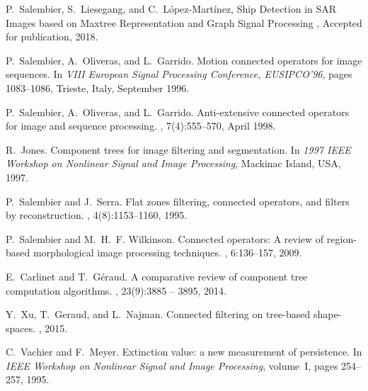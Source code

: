 \documentclass[DIV=calc, paper=a4, fontsize=11pt]{scrartcl}	 %
\begin{document}
\begin{thebibliography}{1}

P.~Salembier, S.~Liesegang, and C.~L\'opez-Mart\'inez,
\newblock Ship Detection in SAR Images based on Maxtree Representation and Graph Signal Processing
, Accepted for publication, 2018.
  
P.~Salembier, A.~Oliveras, and L.~Garrido.
\newblock Motion connected operators for image sequences.
\newblock In {\em VIII European Signal Processing Conference, EUSIPCO'96},
  pages 1083--1086, Trieste, Italy, September 1996.

P.~Salembier, A.~Oliveras, and L.~Garrido.
\newblock Anti-extensive connected operators for image and sequence processing.
, 7(4):555--570, April
  1998.

R.~Jones.
\newblock Component trees for image filtering and segmentation.
\newblock In {\em 1997 IEEE Workshop on Nonlinear Signal and Image Processing},
  Mackinac Island, USA, 1997.

P.~Salembier and J.~Serra.
\newblock Flat zones filtering, connected operators, and filters by
  reconstruction.
, 4(8):1153--1160, 1995.

P.~Salembier and M.~H.~F. Wilkinson.
\newblock Connected operators: A review of region-based morphological image
  processing techniques.
, 6:136--157, 2009.

E.~Carlinet and T.~G{\'e}raud.
\newblock A comparative review of component tree computation algorithms.
, 23(9):3885 -- 3895,
  2014.

Y.~Xu, T.~Geraud, and L.~Najman.
\newblock Connected filtering on tree-based shape-spaces.
,
  2015.

C.~Vachier and F.~Meyer.
\newblock Extinction value: a new measurement of persistence.
\newblock In {\em IEEE Workshop on Nonlinear Signal and Image Processing},
  volume~I, pages 254--257, 1995.

\end{thebibliography}



\printindex 
\end{document}
